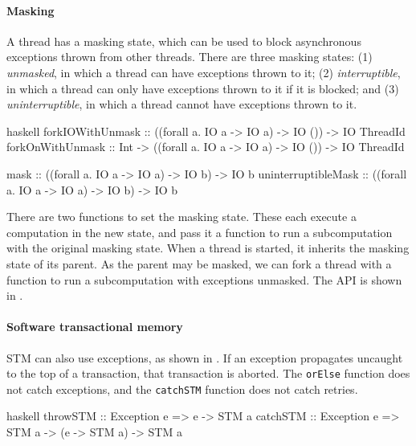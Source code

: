 \paragraph{Masking}
A thread has a masking state, which can be used to block asynchronous
exceptions thrown from other threads.  There are three masking states:
(1) \emph{unmasked}, in which a thread can have exceptions thrown to
it; (2) \emph{interruptible}, in which a thread can only have
exceptions thrown to it if it is blocked; and (3)
\emph{uninterruptible}, in which a thread cannot have exceptions
thrown to it.

\begin{listing}
\centering
\begin{cminted}{haskell}
forkIOWithUnmask    :: ((forall a. IO a -> IO a) -> IO ()) -> IO ThreadId
forkOnWithUnmask    :: Int -> ((forall a. IO a -> IO a) -> IO ()) -> IO ThreadId

mask                :: ((forall a. IO a -> IO a) -> IO b) -> IO b
uninterruptibleMask :: ((forall a. IO a -> IO a) -> IO b) -> IO b
\end{cminted}
\caption{Masking exceptions in Haskell.}\label{lst:excm_haskell}
\end{listing}

There are two functions to set the masking state.  These each execute
a computation in the new state, and pass it a function to run a
subcomputation with the original masking state.  When a thread is
started, it inherits the masking state of its parent.  As the parent
may be masked, we can fork a thread with a function to run a
subcomputation with exceptions unmasked.  The API is shown in
.

\paragraph{Software transactional memory}
STM can also use exceptions, as shown in .
If an exception propagates uncaught to the top of a transaction, that
transaction is aborted.  The \verb|orElse| function does not catch
exceptions, and the \verb|catchSTM| function does not catch retries.

\begin{listing}
\centering
\begin{cminted}{haskell}
throwSTM :: Exception e => e -> STM a
catchSTM :: Exception e => STM a -> (e -> STM a) -> STM a
\end{cminted}
\caption{STM exceptions in Haskell.}\label{lst:excstm_haskell}
\end{listing}

